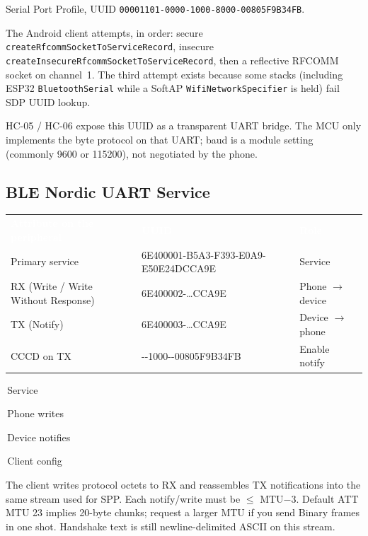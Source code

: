\documentclass[12pt,a4paper]{article}
\newcommand{\thc}[1]{\textcolor{white}{\bfseries #1}}
\newcommand{\chip}[2]{\colorbox{#1}{\strut\,\scriptsize #2\,}}
\begin{document}
Serial Port Profile, UUID
\texttt{00001101-0000-1000-8000-00805F9B34FB}.

The Android client attempts, in order: secure
\texttt{createRfcommSocketToServiceRecord}, insecure
\texttt{createInsecureRfcommSocketToServiceRecord}, then a reflective
RFCOMM socket on channel~1.
The third attempt exists because some stacks (including ESP32
\texttt{BluetoothSerial} while a SoftAP \texttt{WifiNetworkSpecifier} is
held) fail SDP UUID lookup.

HC-05 / HC-06 expose this UUID as a transparent UART bridge.
The MCU only implements the byte protocol on that UART; baud is a module
setting (commonly 9600 or 115200), not negotiated by the phone.

\subsection{BLE Nordic UART Service}

\begin{center}
\renewcommand{\arraystretch}{1.25}
\begin{tabular}{>{\raggedright\arraybackslash}p{4.4cm}
                >{\raggedright\arraybackslash}p{6.2cm}
                >{\centering\arraybackslash}p{2.7cm}}
\rowcolor{TblHead}
\thc{Attribute on the peripheral} & \thc{UUID} & \thc{Role} \\
\rowcolor{TblSync}
Primary service &
  {\small\ttfamily 6E400001-\allowbreak B5A3-F393-\allowbreak E0A9-\allowbreak E50E24DCCA9E} &
  Service \\
\rowcolor{TblChan}
RX (Write / Write Without Response) &
  {\small\ttfamily 6E400002-\ldots CCA9E} &
  Phone $\rightarrow$ device \\
\rowcolor{TblTelem}
TX (Notify) &
  {\small\ttfamily 6E400003-\ldots CCA9E} &
  Device $\rightarrow$ phone \\
\rowcolor{TblLen}
CCCD on TX &
  {\small\ttfamily 00002902-\allowbreak 0000-1000-\allowbreak 8000-\allowbreak 00805F9B34FB} &
  Enable notify \\
\end{tabular}

\vspace{0.4em}
\chip{TblSync}{Service}
\chip{TblChan}{Phone writes}
\chip{TblTelem}{Device notifies}
\chip{TblLen}{Client config}
\end{center}

The client writes protocol octets to RX and reassembles TX notifications
into the same stream used for SPP.
Each notify/write must be $\le$ MTU$-3$.
Default ATT MTU 23 implies 20-byte chunks; request a larger MTU if you
send Binary frames in one shot.
Handshake text is still newline-delimited ASCII on this stream.
\end{document}
